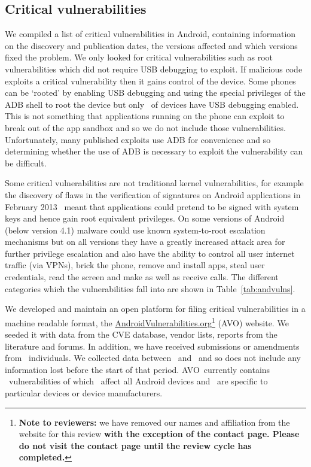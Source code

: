 \documentclass{llncs}
\newcommand{\avo}{AVO}
\begin{document}
\subsection{Critical vulnerabilities}

We compiled a list of critical vulnerabilities in Android, containing information on the discovery and publication dates, the versions affected and which versions fixed the problem.
We only looked for critical vulnerabilities such as root vulnerabilities which did not require USB debugging to exploit.
If malicious code exploits a critical vulnerability then it gains control of the device.
Some phones can be `rooted' by enabling USB debugging and using the special privileges of the ADB shell to root the device but only \daAdbEnabledPerc\ of devices have USB debugging enabled.
This is not something that applications running on the phone can exploit to break out of the app sandbox and so we do not include those vulnerabilities.
Unfortunately, many published exploits use ADB for convenience and so determining whether the use of ADB is necessary to exploit the vulnerability can be difficult.

Some critical vulnerabilities are not traditional kernel vulnerabilities, for example the discovery of flaws in the verification of signatures on Android applications in February 2013~\cite{Forristal2013} meant that applications could pretend to be signed with system keys and hence gain root equivalent privileges.
On some versions of Android (below version 4.1) malware could use known system-to-root escalation mechanisms but on all versions they have a greatly increased attack area for further privilege escalation and also have the ability to control all user internet traffic (via VPNs), brick the phone, remove and install apps, steal user credentials, read the screen and make as well as receive calls.
The different categories which the vulnerabilities fall into are shown in Table~\ref{tab:andvulns}.
\avoTabAndVulns

We developed and maintain an open platform for filing critical vulnerabilities in a machine readable format, the \href{http://androidvulnerabilities.org/}{AndroidVulnerabilities.org}\footnote{\textbf{Note to reviewers:} we have removed our names and affiliation from the website for this review \textbf{with the exception of the contact page. Please do not visit the contact page until the review cycle has completed.}\vspace{-4em}} (\avo) website.
We seeded it with data from the CVE database, vendor lists, reports from the literature and forums.
In addition, we have received submissions or amendments from \avoNumSubmitters\ individuals.
We collected data between \avoStartDate\ and \avoEndDate\ and so does not include any information lost before the start of that period.
\avo\ currently contains \avoNumVulnerabilities\ vulnerabilities of which \avoNumVulnAllAndroid\ affect all Android devices and \avoNumVulnSpecific\ are specific to particular devices or device manufacturers.
\end{document}
